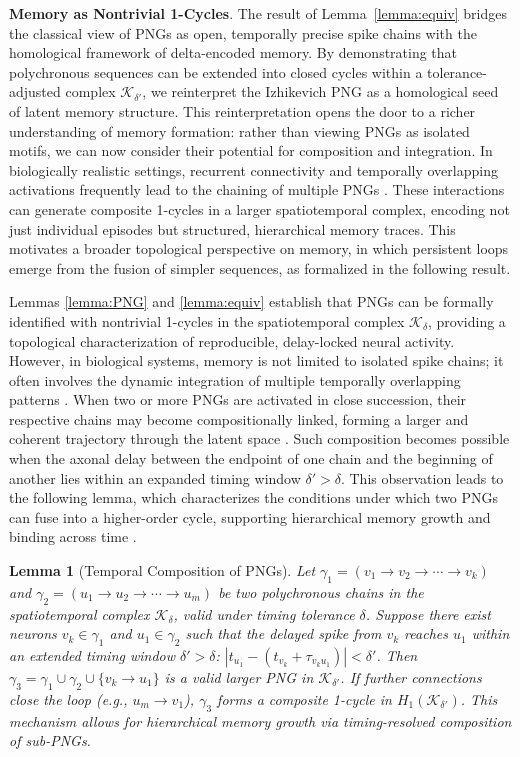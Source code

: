 \documentclass[lettersize,journal]{IEEEtran}
\newtheorem{lemma}{Lemma}
\begin{document}
\noindent\textbf{Memory as Nontrivial 1-Cycles}. The result of Lemma~\ref{lemma:equiv} bridges the classical view of PNGs as open, temporally precise spike chains with the homological framework of delta-encoded memory. By demonstrating that polychronous sequences can be extended into closed cycles within a tolerance-adjusted complex \( \mathcal{K}_{\delta'} \), we reinterpret the Izhikevich PNG as a homological seed of latent memory structure. This reinterpretation opens the door to a richer understanding of memory formation: rather than viewing PNGs as isolated motifs, we can now consider their potential for composition and integration. In biologically realistic settings, recurrent connectivity and temporally overlapping activations frequently lead to the chaining of multiple PNGs \cite{st2015implications}. These interactions can generate composite 1-cycles in a larger spatiotemporal complex, encoding not just individual episodes but structured, hierarchical memory traces. This motivates a broader topological perspective on memory, in which persistent loops emerge from the fusion of simpler sequences, as formalized in the following result.

Lemmas \ref{lemma:PNG} and \ref{lemma:equiv} establish that PNGs can be formally identified with nontrivial 1-cycles in the spatiotemporal complex \( \mathcal{K}_\delta \), providing a topological characterization of reproducible, delay-locked neural activity. However, in biological systems, memory is not limited to isolated spike chains; it often involves the dynamic integration of multiple temporally overlapping patterns \cite{buzsaki2010neural}. When two or more PNGs are activated in close succession, their respective chains may become compositionally linked, forming a larger and coherent trajectory through the latent space \cite{fiete2010spike}. Such composition becomes possible when the axonal delay between the endpoint of one chain and the beginning of another lies within an expanded timing window \( \delta' > \delta \). This observation leads to the following lemma, which characterizes the conditions under which two PNGs can fuse into a higher-order cycle, supporting hierarchical memory growth and binding across time \cite{hasson2015hierarchical}.


\begin{lemma}[Temporal Composition of PNGs]
Let \( \gamma_1 = (v_1 \to v_2 \to \cdots \to v_k) \) and \( \gamma_2 = (u_1 \to u_2 \to \cdots \to u_m) \) be two polychronous chains in the spatiotemporal complex \( \mathcal{K}_\delta \), valid under timing tolerance \( \delta \).
Suppose there exist neurons \( v_k \in \gamma_1 \) and \( u_1 \in \gamma_2 \) such that the delayed spike from \( v_k \) reaches \( u_1 \) within an extended timing window \( \delta' > \delta \):
$|t_{u_1} - (t_{v_k} + \tau_{v_k u_1})| < \delta'$.
Then \( \gamma_3 = \gamma_1 \cup \gamma_2 \cup \{v_k \to u_1\} \) is a valid larger PNG in \( \mathcal{K}_{\delta'} \). If further connections close the loop (e.g., \( u_m \to v_1 \)), \( \gamma_3 \) forms a composite 1-cycle in \( H_1(\mathcal{K}_{\delta'}) \).
This mechanism allows for hierarchical memory growth via timing-resolved composition of sub-PNGs.
\label{lemma:TC_PNG}
\end{lemma}
\end{document}
